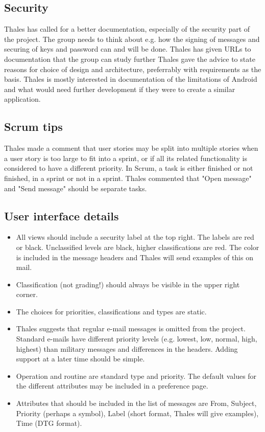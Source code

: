\documentclass[a4paper,12pt]{article}
\begin{document}
\subsection{Security}
Thales has called for a better documentation, especially of the security part of the project. The group needs to 
think about e.g. how the signing of messages and securing of keys and password can and will be done. Thales
has given URLs to documentation that the group can study further
\newline
\newline
 Thales gave the advice to state reasons for 
choice of design and architecture, preferrably with requirements as the basis. 
\newline
\newline
Thales is mostly interested in documentation of the limitations of Android and what would need further development
if they were to create a similar application.
\subsection{Scrum tips}
Thales made a comment that user stories may be split into multiple stories when a user story is too large to fit into a sprint, or if all its related functionality is considered to have a different priority.
In Scrum, a task is either finished or not finished, in a sprint or not in a sprint. 
\newline
\newline
Thales commented that "Open message" and "Send message" should be separate tasks.
\subsection{User interface details}
\begin{itemize}
\item
All views should include a security label at the top right. The labels are red or black. Unclassified levels are black, higher classifications are red. The color is included in the message headers and Thales will send examples of this on mail.
\item
Classification (not grading!) should always be visible in the upper right corner.
\item
The choices for priorities, classifications and types are static.
\item
Thales suggests that regular e-mail messages is omitted from the project. Standard e-mails have different priority levels (e.g. lowest, low, normal, high, highest) than military messages and differences in the headers. Adding support at a later time should be simple. 
\item
Operation and routine are standard type and priority. The default values for the different
attributes may be included in a preference page.
\item
Attributes that should be included in the list of messages are From, Subject, Priority (perhaps a symbol), Label (short format, Thales will give examples), Time (DTG format). 
\end{itemize}
\end{document}
